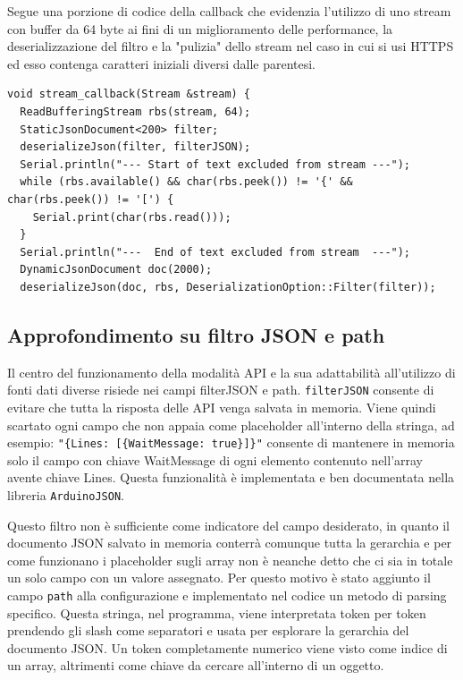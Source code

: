 \documentclass[12pt,a4paper]{report}
\begin{document}
Segue una porzione di codice della callback che evidenzia l'utilizzo di uno stream con buffer da 64 byte ai fini di un miglioramento delle
performance, la deserializzazione del filtro e la "pulizia" dello stream nel caso in cui si usi HTTPS ed esso contenga caratteri iniziali
diversi dalle parentesi.
\begin{lstlisting}
void stream_callback(Stream &stream) {
  ReadBufferingStream rbs(stream, 64);
  StaticJsonDocument<200> filter;
  deserializeJson(filter, filterJSON);
  Serial.println("--- Start of text excluded from stream ---");
  while (rbs.available() && char(rbs.peek()) != '{' && char(rbs.peek()) != '[') {
    Serial.print(char(rbs.read()));
  }
  Serial.println("---  End of text excluded from stream  ---");
  DynamicJsonDocument doc(2000);
  deserializeJson(doc, rbs, DeserializationOption::Filter(filter));
\end{lstlisting}

\subsection{Approfondimento su filtro JSON e path}
Il centro del funzionamento della modalità API e la sua adattabilità all'utilizzo di fonti dati diverse risiede nei campi
filterJSON e path.
\texttt{filterJSON} consente di evitare che tutta la risposta delle API venga salvata in memoria. Viene quindi scartato ogni campo che non
appaia come placeholder all'interno della stringa, ad esempio:
\texttt{"\{Lines: [\{WaitMessage: true\}]\}"} consente di mantenere
in memoria solo il campo con chiave WaitMessage di ogni elemento contenuto nell'array avente chiave Lines. Questa funzionalità è
implementata e ben documentata nella libreria \texttt{ArduinoJSON}.~\cite{arduinojsonfiltering}

Questo filtro non è sufficiente come indicatore del campo desiderato, in quanto il documento JSON salvato in memoria conterrà comunque
tutta la gerarchia e per come funzionano i placeholder sugli array non è neanche detto che ci sia in totale un solo campo con un valore
assegnato.
Per questo motivo è stato aggiunto il campo \texttt{path} alla configurazione e implementato nel codice un metodo di parsing specifico.
Questa stringa, nel programma, viene interpretata token per token prendendo gli slash come separatori e usata per esplorare
la gerarchia del documento JSON. Un token completamente numerico viene visto come indice di un array, altrimenti come chiave da
cercare all'interno di un oggetto.
\end{document}
